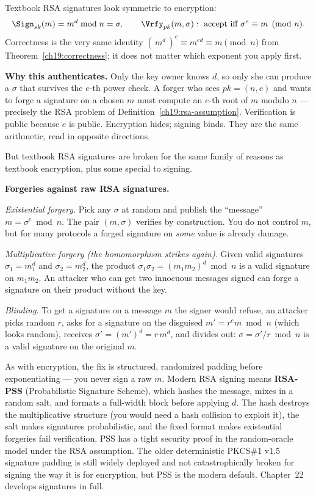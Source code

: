 Textbook RSA signatures look symmetric to encryption:
\[
  \Sign_{sk}(m) = m^{d}\bmod n = \sigma, \qquad
  \Vrfy_{pk}(m,\sigma) : \ \text{accept iff } \sigma^{e}\equiv m \pmod n.
\]
Correctness is the very same identity $(\,m^d\,)^e \equiv m^{ed}\equiv m\pmod n$ from Theorem~\ref{ch19:correctness}; it does not matter which exponent you apply first.

\begin{whybox}
\textbf{Why this authenticates.} Only the key owner knows $d$, so only she can produce a $\sigma$ that survives the $e$-th power check. A forger who sees $pk=(n,e)$ and wants to forge a signature on a chosen $m$ must compute an $e$-th root of $m$ modulo $n$ --- precisely the RSA problem of Definition~\ref{ch19:rsa-assumption}. Verification is public because $e$ is public. Encryption hides; signing binds. They are the same arithmetic, read in opposite directions.
\end{whybox}

But textbook RSA signatures are broken for the same family of reasons as textbook encryption, plus some special to signing.

\begin{attackbox}
\textbf{Forgeries against raw RSA signatures.}

\emph{Existential forgery.} Pick any $\sigma$ at random and publish the ``message'' $m = \sigma^e\bmod n$. The pair $(m,\sigma)$ verifies by construction. You do not control $m$, but for many protocols a forged signature on \emph{some} value is already damage.

\emph{Multiplicative forgery (the homomorphism strikes again).} Given valid signatures $\sigma_1=m_1^d$ and $\sigma_2=m_2^d$, the product $\sigma_1\sigma_2 = (m_1 m_2)^d\bmod n$ is a valid signature on $m_1 m_2$. An attacker who can get two innocuous messages signed can forge a signature on their product without the key.

\emph{Blinding.} To get a signature on a message $m$ the signer would refuse, an attacker picks random $r$, asks for a signature on the disguised $m' = r^e m\bmod n$ (which looks random), receives $\sigma' = (m')^d = r\,m^d$, and divides out: $\sigma = \sigma'/r\bmod n$ is a valid signature on the original $m$.
\end{attackbox}

\begin{trapbox}
As with encryption, the fix is structured, randomized padding before exponentiating --- you never sign a raw $m$. Modern RSA signing means \textbf{RSA-PSS} (Probabilistic Signature Scheme), which hashes the message, mixes in a random salt, and formats a full-width block before applying $d$. The hash destroys the multiplicative structure (you would need a hash collision to exploit it), the salt makes signatures probabilistic, and the fixed format makes existential forgeries fail verification. PSS has a tight security proof in the random-oracle model under the RSA assumption. The older deterministic PKCS\#1 v1.5 signature padding is still widely deployed and not catastrophically broken for signing the way it is for encryption, but PSS is the modern default. Chapter~22 develops signatures in full.
\end{trapbox}

